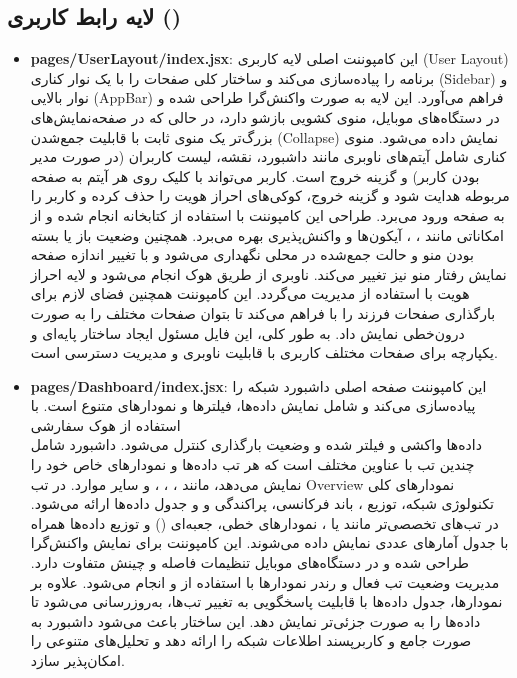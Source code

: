     \subsection{لایه رابط کاربری ()}
    \begin{itemize}
    	\item \textbf{pages/UserLayout/index.jsx}: این کامپوننت اصلی لایه کاربری (User Layout) برنامه را پیاده‌سازی می‌کند و ساختار کلی صفحات را با یک نوار کناری (Sidebar) و نوار بالایی (AppBar) فراهم می‌آورد.  
    	این لایه به صورت واکنش‌گرا طراحی شده و در دستگاه‌های موبایل، منوی کشویی بازشو دارد، در حالی که در صفحه‌نمایش‌های بزرگ‌تر یک منوی ثابت با قابلیت جمع‌شدن (Collapse) نمایش داده می‌شود.  
    	منوی کناری شامل آیتم‌های ناوبری مانند داشبورد، نقشه، لیست کاربران (در صورت مدیر بودن کاربر) و گزینه خروج است.  
    	کاربر می‌تواند با کلیک روی هر آیتم به صفحه مربوطه هدایت شود و گزینه خروج، کوکی‌های احراز هویت را حذف کرده و کاربر را به صفحه ورود می‌برد.  
    	طراحی این کامپوننت با استفاده از کتابخانه  انجام شده و از امکاناتی مانند ، ، آیکون‌ها و واکنش‌پذیری بهره می‌برد.  
    	همچنین وضعیت باز یا بسته بودن منو و حالت جمع‌شده در  محلی نگهداری می‌شود و با تغییر اندازه صفحه نمایش رفتار منو نیز تغییر می‌کند.  
    	ناوبری از طریق هوک  انجام می‌شود و لایه احراز هویت با استفاده از  مدیریت می‌گردد.  
    	این کامپوننت همچنین فضای لازم برای بارگذاری صفحات فرزند را با  فراهم می‌کند تا بتوان صفحات مختلف را به صورت درون‌خطی نمایش داد.  
    	به طور کلی، این فایل مسئول ایجاد ساختار پایه‌ای و یکپارچه برای صفحات مختلف کاربری با قابلیت ناوبری و مدیریت دسترسی است.
    	
    	\item \textbf{pages/Dashboard/index.jsx}:  
    	این کامپوننت صفحه اصلی داشبورد شبکه را پیاده‌سازی می‌کند و شامل نمایش داده‌ها، فیلترها و نمودارهای متنوع است.  
    	با استفاده از هوک سفارشی\\  داده‌ها واکشی و فیلتر شده و وضعیت بارگذاری کنترل می‌شود.  
    	داشبورد شامل چندین تب با عناوین مختلف است که هر تب داده‌ها و نمودارهای خاص خود را نمایش می‌دهد، مانند ، ، ،  و سایر موارد.  
    	در تب Overview نمودارهای کلی تکنولوژی شبکه، توزیع ، باند فرکانسی، پراکندگی  و  و جدول داده‌ها ارائه می‌شود.  
    	در تب‌های تخصصی‌تر مانند  یا ، نمودارهای خطی، جعبه‌ای () و توزیع داده‌ها همراه با جدول آمارهای عددی نمایش داده می‌شوند.  
    	این کامپوننت برای نمایش واکنش‌گرا طراحی شده و در دستگاه‌های موبایل تنظیمات فاصله و چینش متفاوت دارد.  
    	مدیریت وضعیت تب فعال و رندر نمودارها با استفاده از  و  انجام می‌شود.  
    	علاوه بر نمودارها، جدول داده‌ها با قابلیت پاسخگویی به تغییر تب‌ها، به‌روزرسانی می‌شود تا داده‌ها را به صورت جزئی‌تر نمایش دهد.  
    	این ساختار باعث می‌شود داشبورد به صورت جامع و کاربرپسند اطلاعات شبکه را ارائه دهد و تحلیل‌های متنوعی را امکان‌پذیر سازد.
    	

\end{itemize}
